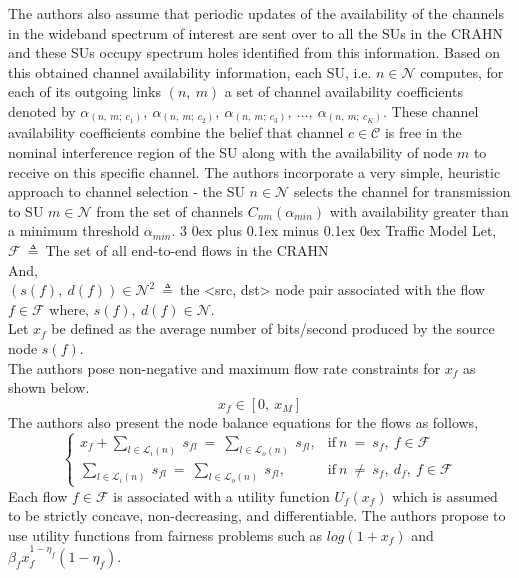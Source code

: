 \documentclass[12pt, draftcls, onecolumn]{IEEEtran}
\makeatletter
\def\subsubsection{\@startsection{subsubsection}%
                                 {3}%
                                 {\z@}%
                                 {0ex plus 0.1ex minus 0.1ex}%
                                 {0ex}%
                                 {\normalfont\normalsize\bfseries}}%
\makeatother
\begin{document}
The authors also assume that periodic updates of the availability of the channels in the wideband spectrum of interest are sent over to all the SUs in the CRAHN and these SUs occupy spectrum holes identified from this information. Based on this obtained channel availability information, each SU, i.e. $n \in \mathcal{N}$ computes, for each of its outgoing links $(n,\ m)$ a set of channel availability coefficients denoted by $\alpha_{(n,\ m;\ c_1)},\ \alpha_{(n,\ m;\ c_2)},\ \alpha_{(n,\ m;\ c_3)},\ ...,\ \alpha_{(n,\ m;\ c_K)}$. These channel availability coefficients combine the belief that channel $c \in \mathcal{C}$ is free in the nominal interference region of the SU along with the availability of node $m$ to receive on this specific channel. The authors incorporate a very simple, heuristic approach to channel selection - the SU $n \in \mathcal{N}$ selects the channel for transmission to SU $m \in \mathcal{N}$ from the set of channels $C_{nm}(\alpha_{min})$ with availability greater than a minimum threshold $\alpha_{min}$.
\subsubsection{Traffic Model}
Let,
\\$\mathcal{F}\ \triangleq\ $The set of all end-to-end flows in the CRAHN
\\And,
\\$(s(f),\ d(f)) \in \mathcal{N}^2\ \triangleq\ $the <src, dst> node pair associated with the flow $f \in \mathcal{F}$ where, $s(f),\ d(f) \in \mathcal{N}$.
\\Let $x_f$ be defined as the average number of bits/second produced by the source node $s(f)$.
\\The authors pose non-negative and maximum flow rate constraints for $x_f$ as shown below.
\[x_f \in [0,\ x_M]\]
The authors also present the node balance equations for the flows as follows,
\begin{equation*}
    \begin{cases}
        x_f + \sum_{l \in \mathcal{L}_i(n)}\ s_{fl}\ =\ \sum_{l \in \mathcal{L}_o(n)}\ s_{fl}, & \text{if}\ n\ =\ s_{f},\ f \in \mathcal{F}\\
        \sum_{l \in \mathcal{L}_i(n)}\ s_{fl}\ =\ \sum_{l \in \mathcal{L}_o(n)}\ s_{fl}, & \text{if}\ n\ \not=\ s_{f},\ d_f,\ f \in \mathcal{F}
    \end{cases}
\end{equation*}
Each flow $f \in \mathcal{F}$ is associated with a utility function $U_f(x_f)$ which is assumed to be strictly concave, non-decreasing, and differentiable. The authors propose to use utility functions from fairness problems such as $log(1 + x_f)$ and $\beta_f x_f^{1-\eta_f}(1-\eta_f)$.
\end{document}
